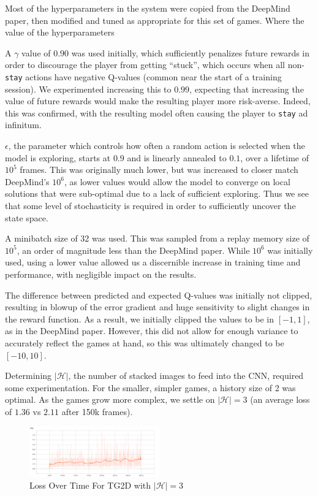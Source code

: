 \documentclass[9pt,journal]{IEEEtran}
\begin{document}
Most of the hyperparameters in the system were copied from the DeepMind paper, then modified and tuned as appropriate for this set of games. Where the value of the hyperparameters

A $\gamma$ value of $0.90$ was used initially, which sufficiently penalizes future rewards in order to discourage the player from getting ``stuck'', which occurs when all non-\texttt{stay} actions have negative Q-values (common near the start of a training session). We experimented increasing this to $0.99$, expecting that increasing the value of future rewards would make the resulting player more risk-averse. Indeed, this was confirmed, with the resulting model often causing the player to \texttt{stay} ad infinitum.

$\epsilon$, the parameter which controls how often a random action is selected when the model is exploring, starts at $0.9$ and is linearly annealed to $0.1$, over a lifetime of $10^5$ frames. This was originally much lower, but was increased to closer match DeepMind's $10^6$, as lower values would allow the model to converge on local solutions that were sub-optimal due to a lack of sufficient exploring. Thus we see that some level of stochasticity is required in order to sufficiently uncover the state space.

A minibatch size of 32 was used. This was sampled from a replay memory size of $10^5$, an order of magnitude less than the DeepMind paper. While $10^6$ was initially used, using a lower value allowed us a discernible increase in training time and performance, with negligible impact on the results.

The difference between predicted and expected Q-values was initially not clipped, resulting in blowup of the error gradient and huge sensitivity to slight changes in the reward function. As a result, we initially clipped the values to be in $[-1, 1]$, as in the DeepMind paper. However, this did not allow for enough variance to accurately reflect the games at hand, so this was ultimately changed to be $[-10, 10]$.

Determining $|\mathcal{H}|$, the number of stacked images to feed into the CNN, required some experimentation. For the smaller, simpler games, a history size of 2 was optimal. As the games grow more complex, we settle on $|\mathcal{H}| = 3$ (an average loss of $1.36$ vs $2.11$ after 150k frames).

\begin{figure}[ht]
  \includegraphics[width=0.5\textwidth]{report/history_size_3}
  \centering
  \caption{Loss Over Time For TG2D with $|\mathcal{H}| = 3$}
  \label{fig:tg2dh3loss}
\end{figure}
\end{document}
